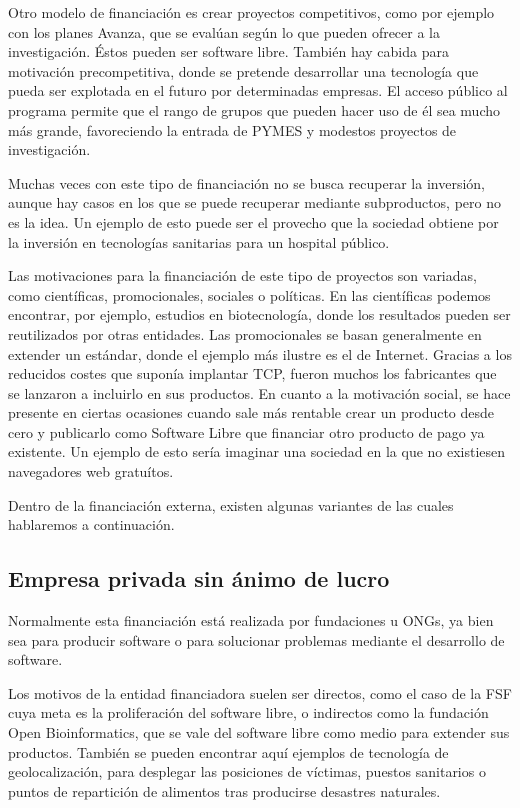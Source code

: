 Otro modelo de financiación es crear proyectos competitivos, como por ejemplo
con los planes Avanza, que se evalúan según lo que pueden ofrecer a la
investigación. Éstos pueden ser software libre.
También hay cabida para motivación precompetitiva, donde se
pretende desarrollar una tecnología que pueda ser explotada en el
futuro por determinadas empresas. El acceso público al programa
permite que el rango de grupos que pueden hacer uso de él sea mucho
más grande, favoreciendo la entrada de PYMES y modestos proyectos de
investigación.

Muchas veces con este tipo de financiación no se busca recuperar la inversión,
aunque hay casos en los que se puede recuperar mediante subproductos, pero no
es la idea.
Un ejemplo de esto puede ser el provecho que la sociedad obtiene por
la inversión en tecnologías sanitarias para un hospital público.

Las motivaciones para la financiación de este tipo de proyectos son variadas,
como científicas, promocionales, sociales o políticas.
En las científicas podemos encontrar, por ejemplo, estudios en
biotecnología, donde los resultados pueden ser reutilizados por otras
entidades. Las promocionales se basan generalmente en extender un
estándar, donde el ejemplo más ilustre es el de Internet. Gracias a
los reducidos costes que suponía implantar TCP, fueron muchos los
fabricantes que se lanzaron a incluirlo en sus productos. En cuanto a
la motivación social, se hace presente en ciertas ocasiones cuando
sale más rentable crear un producto desde cero y publicarlo como
Software Libre que financiar otro producto de pago ya existente. Un
ejemplo de esto sería imaginar una sociedad en la que no existiesen
navegadores web gratuítos.

Dentro de la financiación externa, existen algunas variantes de las cuales
hablaremos a continuación.

\subsection{Empresa privada sin ánimo de lucro}

Normalmente esta financiación está realizada por fundaciones u ONGs, ya bien
sea para producir software o para solucionar problemas mediante el desarrollo de
software.

Los motivos de la entidad financiadora suelen ser directos, como el
caso de la FSF cuya meta es la proliferación del software libre, o
indirectos como la fundación Open Bioinformatics, que se vale del
software libre como medio para extender sus productos. También se
pueden encontrar aquí ejemplos de tecnología de geolocalización, para
desplegar las posiciones de víctimas, puestos sanitarios o puntos de
repartición de alimentos tras producirse desastres naturales.

